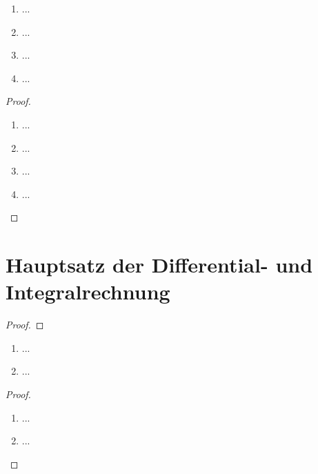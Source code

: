 \documentclass[12pt]{scrreprt}
\begin{document}
\begin{dfn*}

\end{dfn*}

\begin{satz}\label{}
\begin{enumerate}
\item ...
\item ...
\item ...
\item ...
\end{enumerate}
\end{satz}
\begin{proof}
\begin{enumerate}
\item ...
\item ...
\item ...
\item ...
\end{enumerate}
\end{proof}

\section{Hauptsatz der Differential- und Integralrechnung}
\label{}

\begin{dfn}\label{}

\end{dfn}

\begin{lem}\label{}

\end{lem}
\begin{proof}

\end{proof}

\begin{thm}\label{}
\begin{enumerate}
\item ...
\item ...
\end{enumerate}
\end{thm}
\begin{proof}
\begin{enumerate}
\item ...
\item ...
\end{enumerate}
\end{proof}

\begin{bem*}

\end{bem*}
\end{document}
